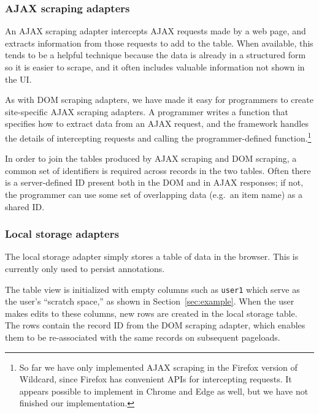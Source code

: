 \documentclass[sigplan,screen,10pt,anonymous,review]{acmart}
\providecommand{\DIFdelbegin}{} %
\begin{document}
\hypertarget{ajax-scraping-adapters}{%
\subsubsection{AJAX scraping adapters}\label{ajax-scraping-adapters}}

An AJAX scraping adapter intercepts AJAX requests made by a web page,
and extracts information from those requests to add to the table. When
available, this tends to be a helpful technique because the data is
already in a structured form so it is easier to scrape, and it often
includes valuable information not shown in the UI.

As with DOM scraping adapters, we have made it easy for programmers to
create site-specific AJAX scraping adapters. A programmer writes a
function that specifies how to extract data from an AJAX request, and
the framework handles the details of intercepting requests and calling
the programmer-defined function.\footnote{So far we have only
  implemented AJAX scraping in the Firefox version of Wildcard, since
  Firefox has convenient APIs for intercepting requests. It appears
  possible to implement in Chrome and Edge as well, but we have not
  finished our implementation.}

In order to join the tables produced by AJAX scraping and DOM scraping,
a common set of identifiers is required across records in the two
tables. Often there is a server-defined ID present both in the DOM and
in AJAX responses; if not, the programmer can use some set of
overlapping data (e.g.~an item name) as a shared ID.

\hypertarget{local-storage-adapters}{%
\subsubsection{Local storage adapters}\label{local-storage-adapters}}

The local storage adapter simply stores a table of data in the browser.
This is currently only used to persist annotations.

The table view is initialized with empty columns such as \texttt{user1}
which serve as the user's ``scratch space,'' as shown in
Section~\ref{sec:example}. When the user makes edits to these columns,
new rows are created in the local storage table. The rows contain the
record ID from the DOM scraping adapter, which enables them to be
re-associated with the same records on subsequent pageloads.

\DIFdelbegin %
\end{document}
